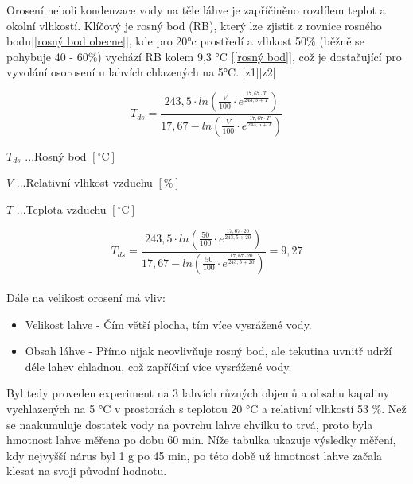 Orosení neboli kondenzace vody na těle láhve je zapříčiněno rozdílem teplot a okolní vlhkostí. Klíčový je rosný bod (RB), který lze zjistit z rovnice rosného bodu[\ref{rosný bod obecne}], kde pro 20°c prostředí a vlhkost 50\% (běžně se pohybuje 40 - 60\%) vychází RB kolem 9,3 °C [\ref{rosný bod}], což je dostačující pro vyvolání osorosení u lahvích chlazených na 5°C. [z1][z2]

\begin{equation}
T_{ds} = \frac{243,5 \cdot ln(\frac{V}{100} \cdot e^{\frac{17,67 \cdot T}{243,5 + T}})}{17,67 - ln(\frac{V}{100} \cdot e^{\frac{17,67 \cdot T}{243,5 + T}})}
\label{rosný bod obecne}
\end{equation}

\(T_{ds}\) ...Rosný bod \([\mathrm{^\circ C}]\)

\(V\) ...Relativní vlhkost vzduchu \([\mathrm{\%}]\)

\(T\) ...Teplota vzduchu \([\mathrm{^\circ C}]\)

\begin{equation}
T_{ds} = \frac{243,5 \cdot ln(\frac{50}{100} \cdot e^{\frac{17,67 \cdot 20}{243,5 + 20}})}{17,67 - ln(\frac{50}{100} \cdot e^{\frac{17,67 \cdot 20}{243,5 + 20}})} = 9,27
\label{rosný bod}
\end{equation}
\\
Dále na velikost orosení má vliv:
\begin{itemize}
    \item Velikost lahve - Čím větší plocha, tím více vysrážené vody.
    \item Obsah láhve - Přímo nijak neovlivňuje rosný bod, ale tekutina uvnitř udrží déle lahev chladnou, což zapříčiní více vysrážené vody.
\end{itemize}

Byl tedy proveden experiment na 3 lahvích různých objemů a obsahu kapaliny vychlazených na 5 °C v prostorách s teplotou 20 °C a relativní vlhkostí 53 \%. Než se naakumuluje dostatek vody na povrchu lahve chvilku to trvá, proto byla hmotnost lahve měřena po dobu 60 min. Níže tabulka ukazuje výsledky měření, kdy nejvyšší nárus byl 1 g po 45 min, po této době už hmotnost lahve začala klesat na svoji původní hodnotu.



